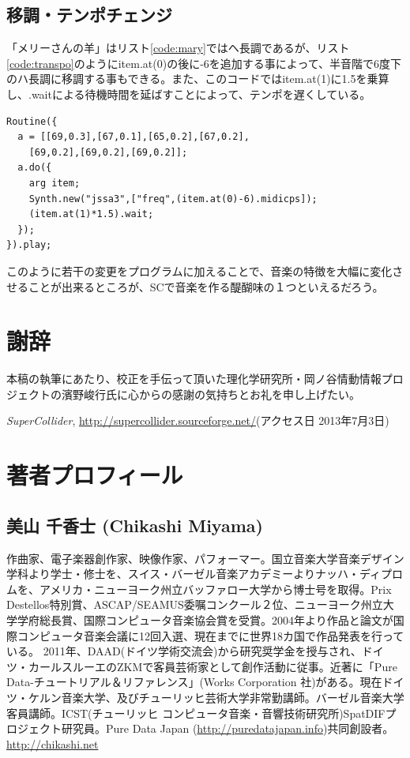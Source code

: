 \documentclass{jsarticle}
\begin{document}
\subsection{移調・テンポチェンジ}
「メリーさんの羊」はリスト\ref{code:mary}ではヘ長調であるが、リスト\ref{code:transpo}のようにitem.at(0)の後に-6を追加する事によって、半音階で6度下のハ長調に移調する事もできる。また、このコードではitem.at(1)に1.5を乗算し、.waitによる待機時間を延ばすことによって、テンポを遅くしている。
\begin{lstlisting}[caption=移調,label=code:transpo]
Routine({
  a = [[69,0.3],[67,0.1],[65,0.2],[67,0.2],
    [69,0.2],[69,0.2],[69,0.2]];
  a.do({
    arg item;
    Synth.new("jssa3",["freq",(item.at(0)-6).midicps]);
    (item.at(1)*1.5).wait;
  });
}).play;
\end{lstlisting}

このように若干の変更をプログラムに加えることで、音楽の特徴を大幅に変化させることが出来るところが、SCで音楽を作る醍醐味の１つといえるだろう。

\section{謝辞}
本稿の執筆にあたり、校正を手伝って頂いた理化学研究所・岡ノ谷情動情報プロジェクトの濱野峻行氏に心からの感謝の気持ちとお礼を申し上げたい。


\begin{thebibliography}{citations}
   {\it SuperCollider}, \url{http://supercollider.sourceforge.net/}(アクセス日 2013年7月3日)
\end{thebibliography}

\section{著者プロフィール}
\subsection*{美山 千香士 (Chikashi Miyama)}
作曲家、電子楽器創作家、映像作家、パフォーマー。国立音楽大学音楽デザイン学科より学士・修士を、スイス・バーゼル音楽アカデミーよりナッハ・ディプロムを、アメリカ・ニューヨーク州立バッファロー大学から博士号を取得。Prix Destellos特別賞、ASCAP/SEAMUS委嘱コンクール２位、ニューヨーク州立大学学府総長賞、国際コンピュータ音楽協会賞を受賞。2004年より作品と論文が国際コンピュータ音楽会議に12回入選、現在までに世界18カ国で作品発表を行っている。 2011年、DAAD(ドイツ学術交流会)から研究奨学金を授与され、ドイツ・カールスルーエのZKMで客員芸術家として創作活動に従事。近著に「Pure Data-チュートリアル＆リファレンス」(Works Corporation 社)がある。現在ドイツ・ケルン音楽大学、及びチューリッヒ芸術大学非常勤講師。バーゼル音楽大学客員講師。ICST(チューリッヒ コンピュータ音楽・音響技術研究所)SpatDIFプロジェクト研究員。Pure Data Japan (\url{http://puredatajapan.info})共同創設者。\url{http://chikashi.net}
\end{document}
